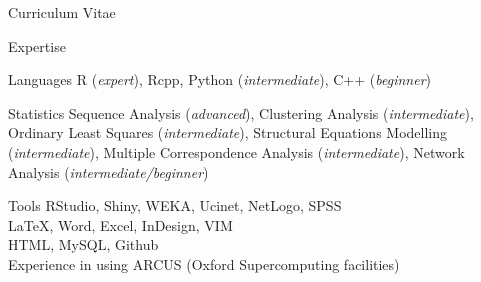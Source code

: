 \documentclass[10pt,a4paper]{article}
\newcommand*{\ac}[1]{\mbox{#1}}
\begin{document}
\begin{cv}{Curriculum Vitae}
  \begin{cvlist}{\ac{Expertise}}
  \item[Languages] R (\emph{expert}), Rcpp, Python (\emph{intermediate}),  C++ (\emph{beginner}) 
  
  \item[Statistics] Sequence Analysis (\emph{advanced}), 
  Clustering Analysis (\emph{intermediate}), 
  Ordinary Least Squares (\emph{intermediate}), Structural Equations Modelling (\emph{intermediate}), Multiple Correspondence Analysis (\emph{intermediate}), 
  Network Analysis (\emph{intermediate/beginner})
  
  \item[Tools] RStudio, Shiny, \ac{WEKA}, Ucinet, NetLogo, \ac{SPSS} \\ \LaTeX, Word, Excel, InDesign, \ac{VIM} \\ 
 \ac{HTML},  MySQL,  Github \\ 
 Experience in using ARCUS (Oxford Supercomputing facilities)
  \end{cvlist}



  \date{~May~2018}
\end{cv}
\end{document}
